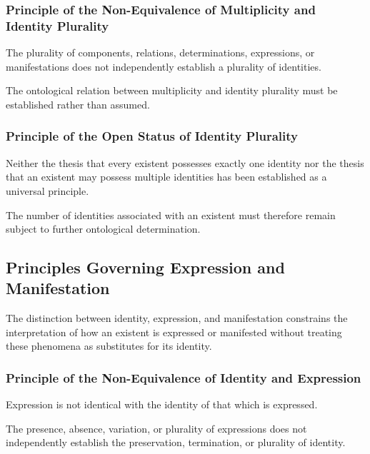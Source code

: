 \subsubsection{Principle of the Non-Equivalence of Multiplicity and Identity Plurality}

The plurality of components, relations, determinations,
expressions, or manifestations does not independently
establish a plurality of identities.

The ontological relation between multiplicity and identity
plurality must be established rather than assumed.

\subsubsection{Principle of the Open Status of Identity Plurality}

Neither the thesis that every existent possesses exactly
one identity nor the thesis that an existent may possess
multiple identities has been established as a universal
principle.

The number of identities associated with an existent
must therefore remain subject to further ontological
determination.


\subsection{Principles Governing Expression and Manifestation}

The distinction between identity, expression, and
manifestation constrains the interpretation of how an
existent is expressed or manifested without treating
these phenomena as substitutes for its identity.

\subsubsection{Principle of the Non-Equivalence of Identity and Expression}

Expression is not identical with the identity of that
which is expressed.

The presence, absence, variation, or plurality of
expressions does not independently establish the
preservation, termination, or plurality of identity.


